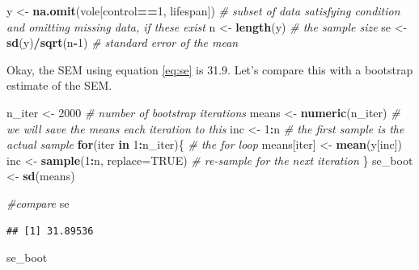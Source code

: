 \documentclass[]{book}
\newenvironment{Shaded}{\begin{snugshade}}{\end{snugshade}}
\newcommand{\KeywordTok}[1]{\textcolor[rgb]{0.13,0.29,0.53}{\textbf{#1}}}
\newcommand{\DataTypeTok}[1]{\textcolor[rgb]{0.13,0.29,0.53}{#1}}
\newcommand{\DecValTok}[1]{\textcolor[rgb]{0.00,0.00,0.81}{#1}}
\newcommand{\StringTok}[1]{\textcolor[rgb]{0.31,0.60,0.02}{#1}}
\newcommand{\CommentTok}[1]{\textcolor[rgb]{0.56,0.35,0.01}{\textit{#1}}}
\newcommand{\OtherTok}[1]{\textcolor[rgb]{0.56,0.35,0.01}{#1}}
\newcommand{\ControlFlowTok}[1]{\textcolor[rgb]{0.13,0.29,0.53}{\textbf{#1}}}
\newcommand{\OperatorTok}[1]{\textcolor[rgb]{0.81,0.36,0.00}{\textbf{#1}}}
\newcommand{\NormalTok}[1]{#1}
\begin{document}
\begin{Shaded}
\begin{Highlighting}[]
\NormalTok{y <-}\StringTok{ }\KeywordTok{na.omit}\NormalTok{(vole[control}\OperatorTok{==}\DecValTok{1}\NormalTok{, lifespan]) }\CommentTok{# subset of data satisfying condition and omitting missing data, if these exist}
\NormalTok{n <-}\StringTok{ }\KeywordTok{length}\NormalTok{(y) }\CommentTok{# the sample size}
\NormalTok{se <-}\StringTok{ }\KeywordTok{sd}\NormalTok{(y)}\OperatorTok{/}\KeywordTok{sqrt}\NormalTok{(n}\OperatorTok{-}\DecValTok{1}\NormalTok{) }\CommentTok{# standard error of the mean}
\end{Highlighting}
\end{Shaded}

Okay, the SEM using equation \eqref{eq:se} is 31.9. Let's compare this
with a bootstrap estimate of the SEM.

\begin{Shaded}
\begin{Highlighting}[]
\NormalTok{n_iter <-}\StringTok{ }\DecValTok{2000} \CommentTok{# number of bootstrap iterations}
\NormalTok{means <-}\StringTok{ }\KeywordTok{numeric}\NormalTok{(n_iter) }\CommentTok{# we will save the means each iteration to this}
\NormalTok{inc <-}\StringTok{ }\DecValTok{1}\OperatorTok{:}\NormalTok{n }\CommentTok{# the first sample is the actual sample}
\ControlFlowTok{for}\NormalTok{(iter }\ControlFlowTok{in} \DecValTok{1}\OperatorTok{:}\NormalTok{n_iter)\{ }\CommentTok{# the for loop}
\NormalTok{  means[iter] <-}\StringTok{ }\KeywordTok{mean}\NormalTok{(y[inc])}
\NormalTok{  inc <-}\StringTok{ }\KeywordTok{sample}\NormalTok{(}\DecValTok{1}\OperatorTok{:}\NormalTok{n, }\DataTypeTok{replace=}\OtherTok{TRUE}\NormalTok{) }\CommentTok{# re-sample for the next iteration}
\NormalTok{\}}
\NormalTok{se_boot <-}\StringTok{ }\KeywordTok{sd}\NormalTok{(means)}

\CommentTok{#compare}
\NormalTok{se}
\end{Highlighting}
\end{Shaded}

\begin{verbatim}
## [1] 31.89536
\end{verbatim}

\begin{Shaded}
\begin{Highlighting}[]
\NormalTok{se_boot}
\end{Highlighting}
\end{Shaded}
\end{document}
